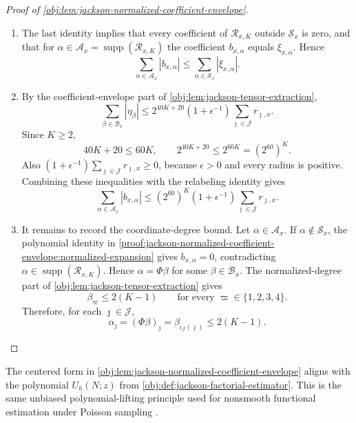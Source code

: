 \documentclass[11pt]{article}
\begin{document}
\begin{proof}[Proof of \cref{obj:lem:jackson-normalized-coefficient-envelope}]
\begin{enumerate}
\item The last identity implies that every coefficient of \(\mathcal R_{x,K}\) outside \(\mathcal S_x\) is zero, and that for \(\alpha\in\mathcal A_x=\operatorname{supp}(\mathcal R_{x,K})\) the coefficient \(b_{x,\alpha}\) equals \(\xi_{x,\alpha}\). Hence
\[
\sum_{\alpha\in\mathcal A_x}|b_{x,\alpha}|
\le
\sum_{\alpha\in\mathcal S_x}|\xi_{x,\alpha}|.
\]

\item By the coefficient-envelope part of \cref{obj:lem:jackson-tensor-extraction},
\[
\sum_{\beta\in\mathcal B_x}|\eta_\beta|
\le
2^{40K+20}(1+\epsilon^{-1})
\sum_{\jmath\in\mathcal J}r_{\jmath,x}.
\]
Since \(K\ge2\),
\[
40K+20\le 60K,
\qquad
2^{40K+20}\le 2^{60K}=(2^{60})^K.
\]
Also \((1+\epsilon^{-1})\sum_{\jmath\in\mathcal J}r_{\jmath,x}\ge0\), because \(\epsilon>0\) and every radius is positive. Combining these inequalities with the relabeling identity gives
\[
\sum_{\alpha\in\mathcal A_x}|b_{x,\alpha}|
\le
(2^{60})^{K}(1+\epsilon^{-1})
\sum_{\jmath\in\mathcal J}r_{\jmath,x}.
\]

\item It remains to record the coordinate-degree bound. Let \(\alpha\in\mathcal A_x\). If \(\alpha\notin\mathcal S_x\), the polynomial identity in \cref{proof:jackson-normalized-coefficient-envelope:normalized-expansion} gives \(b_{x,\alpha}=0\), contradicting \(\alpha\in\operatorname{supp}(\mathcal R_{x,K})\). Hence \(\alpha=\Phi\beta\) for some \(\beta\in\mathcal B_x\). The normalized-degree part of \cref{obj:lem:jackson-tensor-extraction} gives
\[
\beta_\varpi\le 2(K-1)
\qquad\text{for every }\varpi\in\{1,2,3,4\}.
\]
Therefore, for each \(\jmath\in\mathcal J\),
\[
\alpha_\jmath
=
(\Phi\beta)_\jmath
=
\beta_{\iota_{\mathcal J}(\jmath)}
\le
2(K-1).
\]
\end{enumerate}
\end{proof}

The centered form in \cref{obj:lem:jackson-normalized-coefficient-envelope} aligns with the polynomial \(U_h(N;z)\) from \cref{obj:def:jackson-factorial-estimator}. This is the same unbiased polynomial-lifting principle used for nonsmooth functional estimation under Poisson sampling \citep{JiaoVenkatHanWeissman2015Functionals}.
\end{document}
